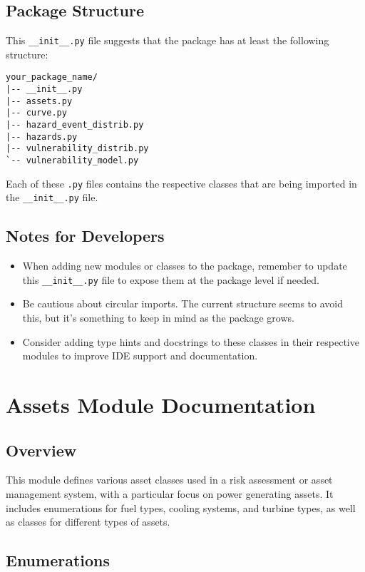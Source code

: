 \documentclass{article}
\begin{document}
\subsection{Package Structure}

This \texttt{\_\_init\_\_.py} file suggests that the package has at least the following structure:

\begin{verbatim}
your_package_name/
|-- __init__.py
|-- assets.py
|-- curve.py
|-- hazard_event_distrib.py
|-- hazards.py
|-- vulnerability_distrib.py
`-- vulnerability_model.py
\end{verbatim}

Each of these \texttt{.py} files contains the respective classes that are being imported in the \texttt{\_\_init\_\_.py} file.

\subsection{Notes for Developers}

\begin{itemize}
    \item When adding new modules or classes to the package, remember to update this \texttt{\_\_init\_\_.py} file to expose them at the package level if needed.
    \item Be cautious about circular imports. The current structure seems to avoid this, but it's something to keep in mind as the package grows.
    \item Consider adding type hints and docstrings to these classes in their respective modules to improve IDE support and documentation.
\end{itemize}

\newpage
\section{Assets Module Documentation}

\subsection{Overview}

This module defines various asset classes used in a risk assessment or asset management system, with a particular focus on power generating assets. It includes enumerations for fuel types, cooling systems, and turbine types, as well as classes for different types of assets.

\subsection{Enumerations}
\end{document}
